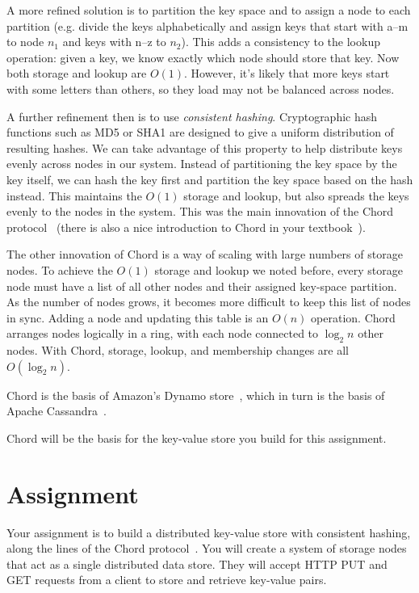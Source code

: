 \documentclass[a4paper]{article}
\begin{document}
A more refined solution is to partition the key space and to assign a node to each partition (e.g. divide the keys alphabetically and assign keys that start with a--m to node $n_1$ and keys with n--z to $n_2$).
This adds a consistency to the lookup operation: given a key, we know exactly which node should store that key.
Now both storage and lookup are $O(1)$.
However, it's likely that more keys start with some letters than others,
so they load may not be balanced across nodes.

A further refinement then is to use \textit{consistent hashing}.
Cryptographic hash functions such as MD5 or SHA1 are designed to give a
uniform distribution of resulting hashes.
We can take advantage of this property to help distribute keys evenly across nodes in our system.
Instead of partitioning the key space by the key itself,
we can hash the key first and partition the key space based on the hash instead.
This maintains the $O(1)$ storage and lookup,
but also spreads the keys evenly to the nodes in the system.
This was the main innovation of the
Chord protocol~\cite{stoica2003chord}
(there is also a nice introduction to Chord in your textbook~\cite[83--84]{Steen2017}).

The other innovation of Chord is a way of scaling with large numbers of storage nodes.
To achieve the $O(1)$ storage and lookup we noted before,
every storage node must have a list of all other nodes and their assigned key-space partition.
As the number of nodes grows, it becomes more difficult to keep this list of nodes in sync. Adding a node and updating this table is an $O(n)$ operation.
Chord arranges nodes logically in a ring, with each node connected to $\log_2 n$ other nodes.
With Chord, storage, lookup, and membership changes are all~$O(\log_2 n)$.

Chord is the basis of
Amazon's Dynamo store~\cite{decandia2007dynamo},
which in turn is the basis of
Apache Cassandra~\cite{lakshman2010cassandra}.

Chord will be the basis for the key-value store you build for this assignment.

\section{Assignment}

Your assignment is to build a distributed key-value store with consistent hashing,
along the lines of the Chord protocol~\cite{stoica2003chord}.
You will create a system of storage nodes that act as a single distributed data store.
They will accept HTTP PUT and GET requests from a client to store and retrieve key-value pairs.
\end{document}
